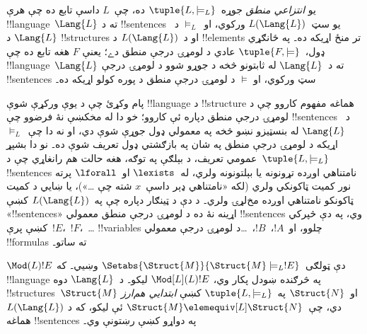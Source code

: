 \documentclass[../../../include/open-logic-section]{subfiles}
\begin{document}

\begin{defn}
يو \emph{انتزاعي منطق} جوړه~$\tuple{L, \models_L}$ ده، چې~$L$ داسې
تابع ده چې هرې !!{language}~$\Lang{L}$ ته د !!{sentence}s يو
سټ~$L(\Lang{L})$ ورکوي، او~$\models_L$ د~$\Lang{L}$ د
!!{structure}s او د~$L(\Lang{L})$ د !!{element}s تر منځ اړيکه ده۔
په ځانګړي ډول،~$\tuple{F, \models}$ عادي د لومړۍ درجې منطق دے؛ يعنې
$F$ هغه تابع ده چې !!{language}~$\Lang{L}$ ته د~$\Lang{L}$ له
ثابتونو څخه د جوړو شوو د لومړۍ درجې !!{sentence}s سټ ورکوي، او
$\models$ د لومړۍ درجې منطق د پوره کولو اړيکه ده۔
\end{defn}

پام وکړئ چې د يوې ورکړې شوې !!{language} د !!{structure} هماغه مفهوم
کاروو چې د لومړۍ درجې منطق دپاره ئې کاروو؛ خو دا له مخکښې نۀ فرضوو
چې !!{sentence}s د~$\Lang{L}$ له بنسټيزو نښو څخه په معمولي ډول جوړې
شوې دي، او نه دا چې~$\models_L$ اړيکه د لومړۍ درجې منطق په شان په
بازګشتي ډول تعريف شوې ده۔ نو دا بشپړ عمومي تعريف، د بېلګې په توګه،
هغه حالت هم رانغاړي چې د~$\tuple{L,\models_L}$ !!{sentence}s نامتناهي
اوږده تړونونه يا بېلتونونه ولري، له~$\lexists$ او~$\lforall$ پرته نور
کميت ټاکونکي ولري (لکه «نامتناهي ډېر داسې~$x$ شته چې \dots»)، يا
ښايي د کميت ټاکونکو نامتناهي اوږده مخ‌لړۍ ولري۔ د دې د ټينګار دپاره
چې په~$L(\Lang{L})$ کښې «!!{sentence}s» اړينه نۀ ده د لومړۍ درجې
منطق معمولي !!{sentence}s وي، په دې څپرکي کښې پرې~$!E$،~$!F$،~\dots
!!{variable}s چلوو، او~$!A$،~$!B$،~\dots د لومړۍ درجې معمولي
!!{formula}s ته ساتو۔

\begin{defn}
$\Mod(L){!E}$ دې ټولګی~$\Setabs{\Struct{M}}{\Struct{M}
  \models_L !E}$ وښيي۔ که !!{language} په څرګنده ښودل پکار وي،
$\Mod[L](L){!E}$ ليکو۔ د~$\Lang{L}$ دوه !!{structure}s~$\Struct{M}$
او~$\Struct{N}$ په~$\tuple{L, \models_L}$ کښې \emph{ابتدايي هم‌ارز}
دي، چې~$\Struct{M} \elemequiv[L] \Struct{N}$ ئې ليکو، که د
$L(\Lang{L})$ هماغه !!{sentence}s په دواړو کښې رښتونې وي۔
\end{defn}
\end{document}
